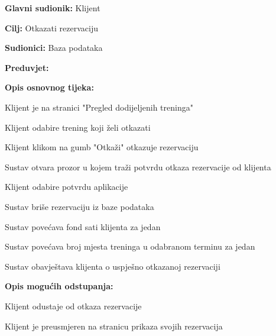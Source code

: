 					\begin{packed_item}
	
						\item \textbf{Glavni sudionik: } Klijent
						\item  \textbf{Cilj:} Otkazati rezervaciju
						\item  \textbf{Sudionici:} Baza podataka
						\item  \textbf{Preduvjet:} 
						\item  \textbf{Opis osnovnog tijeka:}
						
						\item[] \begin{packed_enum}
	                        
							\item Klijent je na stranici "Pregled dodijeljenih treninga"
							\item Klijent odabire trening koji želi otkazati
							\item Klijent klikom na gumb "Otkaži" otkazuje rezervaciju
							\item Sustav otvara prozor u kojem traži potvrdu otkaza rezervacije od klijenta
							\item Klijent odabire potvrdu aplikacije
							\item Sustav briše rezervaciju iz baze podataka
							\item Sustav povećava fond sati klijenta za jedan
							\item Sustav povećava broj mjesta treninga u odabranom terminu za jedan
							\item Sustav obavještava klijenta o uspješno otkazanoj rezervaciji
							
							
						\end{packed_enum}
						\item  \textbf{Opis mogućih odstupanja:}
						\item[] \begin{packed_item}
	
							\item[5.a] Klijent odustaje od otkaza rezervacije
							\item[] \begin{packed_enum}
								
								\item Klijent je preusmjeren na stranicu prikaza svojih rezervacija
								
							\end{packed_enum}
							
								
							
							
						\end{packed_item}						
						
					\end{packed_item}
